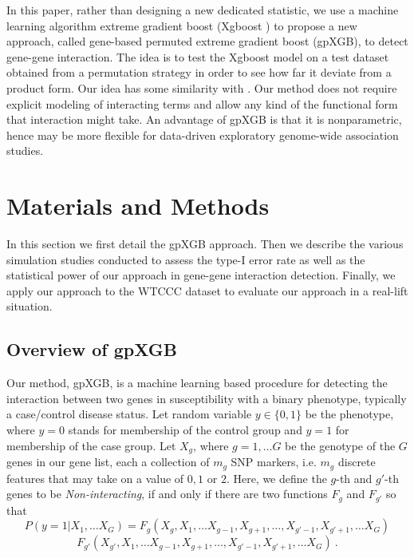 \documentclass[11pt]{article}
\theoremstyle{plain}
\theoremstyle{definition}
\theoremstyle{remark}
\begin{document}
In this paper, rather than designing a new dedicated statistic, we use a machine learning algorithm extreme gradient boost (Xgboost \cite{9}) to propose a new approach, called gene-based permuted extreme gradient boost (gpXGB), to detect gene-gene interaction. The idea is to test the Xgboost model on a test dataset obtained from a permutation strategy in order to see how far it deviate from a product form. Our idea has some similarity with \cite{13}. Our method does not require explicit modeling of interacting terms and allow any kind of the functional form that interaction might take. An advantage of gpXGB is that it is nonparametric, hence may be more flexible for data-driven exploratory genome-wide association studies.

\section{Materials and Methods}


In this section we first detail the gpXGB approach. Then we describe the various simulation studies conducted to assess the type-I error rate as well as the statistical power of our approach in gene-gene interaction detection. Finally, we apply our approach to the WTCCC dataset to evaluate our approach in a real-lift situation.

\subsection{Overview of gpXGB}

Our method, gpXGB, is a machine learning based procedure for detecting the interaction between two genes in susceptibility with a binary phenotype, typically a case/control disease status. Let random variable $y\in\{0,1\}$ be the phenotype, where $y=0$ stands for membership of the control group and $y=1$ for membership of the case group. Let $X_g$, where $g=1,\dots G$ be the genotype of the $G$ genes in our gene list, each a collection of $m_g$ SNP markers, i.e. $m_g$ discrete features that may take on a value of $0,1$ or $2$. Here, we define the $g$-th and $g'$-th genes to be {\em Non-interacting}, if and only if there are two functions $F_g$ and $F_{g'}$ so that
\begin{equation*}
P(y=1|X_1,\dots X_G)= F_g(X_g,X_1,\dots X_{g-1},X_{g+1},\dots, X_{g'-1},X_{g'+1},\dots X_G)
\end{equation*}
\begin{equation}
F_{g'}(X_{g'},X_1,\dots X_{g-1},X_{g+1},\dots, X_{g'-1},X_{g'+1},\dots X_G)\ .
\end{equation}
\end{document}
